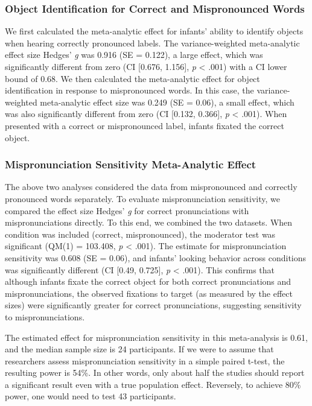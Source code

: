 \documentclass[man, noextraspace]{apa6}
\begin{document}
\hypertarget{object-identification-for-correct-and-mispronounced-words}{%
\subsubsection{Object Identification for Correct and Mispronounced Words}\label{object-identification-for-correct-and-mispronounced-words}}

We first calculated the meta-analytic effect for infants' ability to identify objects when hearing correctly pronounced labels. The variance-weighted meta-analytic effect size Hedges' \emph{g} was 0.916 (SE = 0.122), a large effect, which was significantly different from zero (CI {[}0.676, 1.156{]}, \emph{p} \textless{} .001) with a CI lower bound of 0.68. We then calculated the meta-analytic effect for object identification in response to mispronounced words. In this case, the variance-weighted meta-analytic effect size was 0.249 (SE = 0.06), a small effect, which was also significantly different from zero (CI {[}0.132, 0.366{]}, \emph{p} \textless{} .001). When presented with a correct or mispronounced label, infants fixated the correct object.

\hypertarget{mispronunciation-sensitivity-meta-analytic-effect}{%
\subsubsection{Mispronunciation Sensitivity Meta-Analytic Effect}\label{mispronunciation-sensitivity-meta-analytic-effect}}

The above two analyses considered the data from mispronounced and correctly pronounced words separately. To evaluate mispronunciation sensitivity, we compared the effect size Hedges' \emph{g} for correct pronunciations with mispronunciations directly. To this end, we combined the two datasets. When condition was included (correct, mispronounced), the moderator test was significant (QM(1) = 103.408, \emph{p} \textless{} .001). The estimate for mispronunciation sensitivity was 0.608 (SE = 0.06), and infants' looking behavior across conditions was significantly different (CI {[}0.49, 0.725{]}, \emph{p} \textless{} .001). This confirms that although infants fixate the correct object for both correct pronunciations and mispronunciations, the observed fixations to target (as measured by the effect sizes) were significantly greater for correct pronunciations, suggesting sensitivity to mispronunciations.

The estimated effect for mispronunciation sensitivity in this meta-analysis is 0.61, and the median sample size is 24 participants. If we were to assume that researchers assess mispronunciation sensitivity in a simple paired t-test, the resulting power is 54\%. In other words, only about half the studies should report a significant result even with a true population effect. Reversely, to achieve 80\% power, one would need to test 43 participants.
\end{document}
